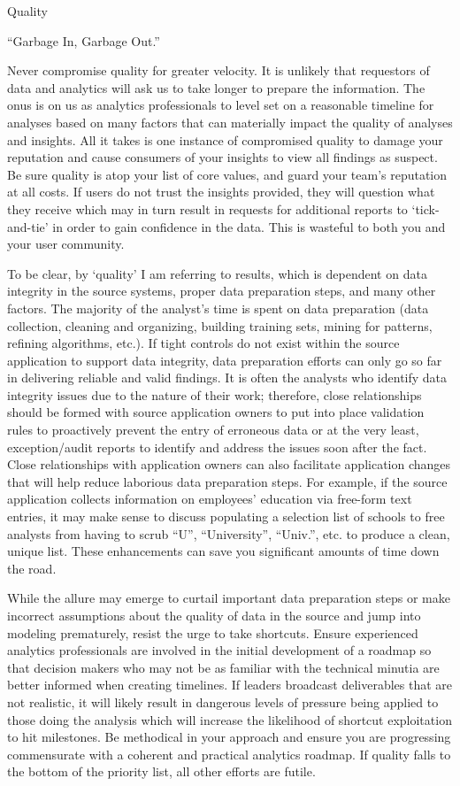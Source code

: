\documentclass[]{book}
\begin{document}
 Quality

``Garbage In, Garbage Out.''

Never compromise quality for greater velocity. It is unlikely that requestors of data and analytics will ask us to take longer to prepare the information. The onus is on us as analytics professionals to level set on a reasonable timeline for analyses based on many factors that can materially impact the quality of analyses and insights. All it takes is one instance of compromised quality to damage your reputation and cause consumers of your insights to view all findings as suspect. Be sure quality is atop your list of core values, and guard your team's reputation at all costs. If users do not trust the insights provided, they will question what they receive which may in turn result in requests for additional reports to `tick-and-tie' in order to gain confidence in the data. This is wasteful to both you and your user community.

To be clear, by `quality' I am referring to results, which is dependent on data integrity in the source systems, proper data preparation steps, and many other factors. The majority of the analyst's time is spent on data preparation (data collection, cleaning and organizing, building training sets, mining for patterns, refining algorithms, etc.). If tight controls do not exist within the source application to support data integrity, data preparation efforts can only go so far in delivering reliable and valid findings. It is often the analysts who identify data integrity issues due to the nature of their work; therefore, close relationships should be formed with source application owners to put into place validation rules to proactively prevent the entry of erroneous data or at the very least, exception/audit reports to identify and address the issues soon after the fact. Close relationships with application owners can also facilitate application changes that will help reduce laborious data preparation steps. For example, if the source application collects information on employees' education via free-form text entries, it may make sense to discuss populating a selection list of schools to free analysts from having to scrub ``U'', ``University'', ``Univ.'', etc. to produce a clean, unique list. These enhancements can save you significant amounts of time down the road.

While the allure may emerge to curtail important data preparation steps or make incorrect assumptions about the quality of data in the source and jump into modeling prematurely, resist the urge to take shortcuts. Ensure experienced analytics professionals are involved in the initial development of a roadmap so that decision makers who may not be as familiar with the technical minutia are better informed when creating timelines. If leaders broadcast deliverables that are not realistic, it will likely result in dangerous levels of pressure being applied to those doing the analysis which will increase the likelihood of shortcut exploitation to hit milestones. Be methodical in your approach and ensure you are progressing commensurate with a coherent and practical analytics roadmap. If quality falls to the bottom of the priority list, all other efforts are futile.
\end{document}
